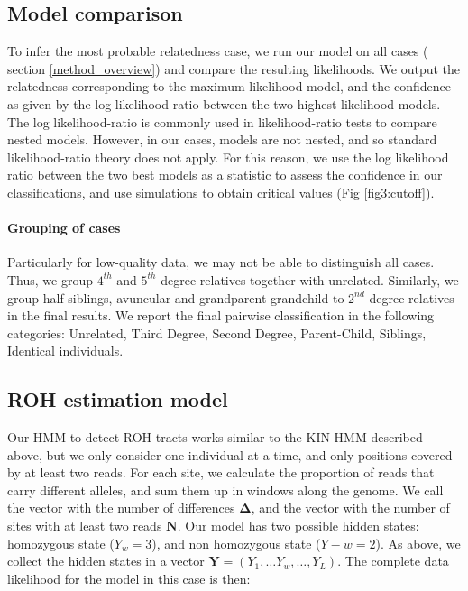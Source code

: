 \documentclass[12pt, letterpaper]{article}
\begin{document}
\subsection{Model comparison}\label{model_comp}
To infer the most probable relatedness case, we run our model on all cases ( section \ref{method_overview}) and compare the resulting likelihoods. We output the relatedness corresponding to the maximum likelihood model, and the confidence as given by the log likelihood ratio between the two highest likelihood models. The log likelihood-ratio is commonly used in likelihood-ratio tests to compare nested models. However, in our cases, models are not nested, and so standard likelihood-ratio theory does not apply. For this reason, we use the log likelihood ratio between the two best models as a statistic to assess the confidence in our classifications, and use simulations to obtain critical values (Fig \ref{fig3:cutoff}). 

\paragraph{Grouping of cases}
Particularly for low-quality data, we may not be able to distinguish all cases. Thus, we group $4^{th}$ and $5^{th}$ degree relatives together with unrelated.  Similarly, we group  half-siblings, avuncular and grandparent-grandchild to  $2^{nd}$-degree relatives in the final results. We report the final pairwise classification in the following categories: Unrelated, Third Degree, Second Degree, Parent-Child, Siblings, Identical individuals.


\subsection{ROH estimation model}\label{roh}
Our HMM to detect ROH tracts works similar to the KIN-HMM described above, but we only consider one individual at a time, and only positions covered by at least two reads. For each site, we calculate the proportion of reads that carry different alleles, and sum them up in windows along the genome. We call the vector with the number of differences $\mathbf{\Delta}$, and the vector with the number of sites with at least two reads $\mathbf{N}$. Our model has two possible hidden states: homozygous state ($Y_w=3$), and non homozygous state ($Y-w=2$). As above, we collect the hidden states in a vector $\mathbf{Y} = (Y_1, \dots Y_w, \dots, Y_L)$. The complete data likelihood for the model in this case is then:
\end{document}
